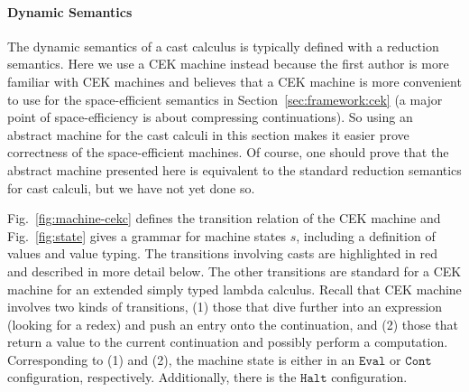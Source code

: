 \documentclass[acmsmall,review,anonymous]{acmart}\settopmatter{printfolios=true,printccs=false,printacmref=false}
\begin{document}


\paragraph{Dynamic Semantics}

The dynamic semantics of a cast calculus is typically defined with a
reduction semantics. Here we use a CEK machine
\citep{felleisen1986control} instead because the first author is more
familiar with CEK machines and believes that a CEK machine is more
convenient to use for the space-efficient semantics in
Section~\ref{sec:framework:cek} (a major point of space-efficiency is about 
compressing continuations). So using an abstract machine for the cast calculi in
this section makes it easier prove correctness of the space-efficient
machines. Of course, one should prove that the abstract machine
presented here is equivalent to the standard reduction semantics for
cast calculi, but we have not yet done so.

Fig.~\ref{fig:machine-cekc} defines the transition relation of the CEK
machine and Fig.~\ref{fig:state} gives a grammar for machine states
$s$, including a definition of values and value typing. The
transitions involving casts are highlighted in red and described in
more detail below. The other transitions are standard for a CEK
machine for an extended simply typed lambda calculus.
%
Recall that CEK machine involves two kinds of transitions, (1) those
that dive further into an expression (looking for a redex) and push an
entry onto the continuation, and (2) those that return a value to the
current continuation and possibly perform a computation.
Corresponding to (1) and (2), the machine state is either in an
$\mathtt{Eval}$ or $\mathtt{Cont}$ configuration, respectively.
Additionally, there is the $\mathtt{Halt}$ configuration.
\end{document}
